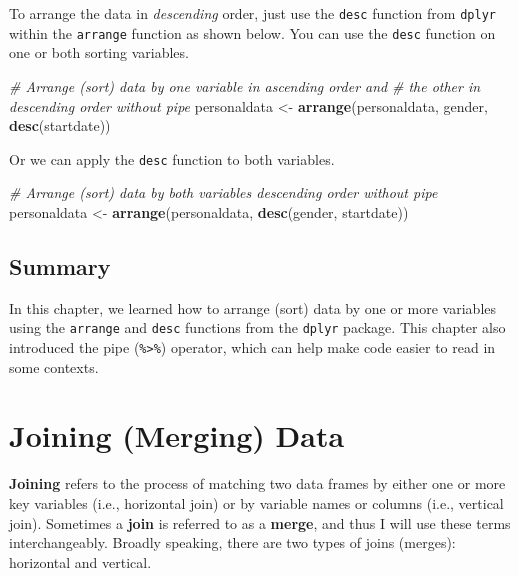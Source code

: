 \documentclass[]{book}
\newenvironment{Shaded}{\begin{snugshade}}{\end{snugshade}}
\newcommand{\KeywordTok}[1]{\textcolor[rgb]{0.13,0.29,0.53}{\textbf{#1}}}
\newcommand{\StringTok}[1]{\textcolor[rgb]{0.31,0.60,0.02}{#1}}
\newcommand{\CommentTok}[1]{\textcolor[rgb]{0.56,0.35,0.01}{\textit{#1}}}
\newcommand{\NormalTok}[1]{#1}
\begin{document}
To arrange the data in \emph{descending} order, just use the
\texttt{desc} function from \texttt{dplyr} within the \texttt{arrange}
function as shown below. You can use the \texttt{desc} function on one
or both sorting variables.

\begin{Shaded}
\begin{Highlighting}[]
\CommentTok{# Arrange (sort) data by one variable in ascending order and }
\CommentTok{# the other in descending order without pipe}
\NormalTok{personaldata <-}\StringTok{ }\KeywordTok{arrange}\NormalTok{(personaldata, gender, }\KeywordTok{desc}\NormalTok{(startdate))}
\end{Highlighting}
\end{Shaded}

Or we can apply the \texttt{desc} function to both variables.

\begin{Shaded}
\begin{Highlighting}[]
\CommentTok{# Arrange (sort) data by both variables descending order without pipe}
\NormalTok{personaldata <-}\StringTok{ }\KeywordTok{arrange}\NormalTok{(personaldata, }\KeywordTok{desc}\NormalTok{(gender, startdate))}
\end{Highlighting}
\end{Shaded}

\section{Summary}\label{summary}

In this chapter, we learned how to arrange (sort) data by one or more
variables using the \texttt{arrange} and \texttt{desc} functions from
the \texttt{dplyr} package. This chapter also introduced the pipe
(\texttt{\%\textgreater{}\%}) operator, which can help make code easier
to read in some contexts.

\hypertarget{join}{\chapter{Joining (Merging) Data}\label{join}}

\textbf{Joining} refers to the process of matching two data frames by
either one or more key variables (i.e., horizontal join) or by variable
names or columns (i.e., vertical join). Sometimes a \textbf{join} is
referred to as a \textbf{merge}, and thus I will use these terms
interchangeably. Broadly speaking, there are two types of joins
(merges): horizontal and vertical.
\end{document}
